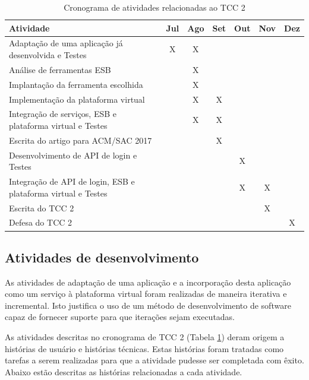\begin{table}[!htb]
\centering
\caption{Cronograma de atividades relacionadas ao TCC 2}
\label{cronograma_tcc2}
\begin{tabular}{|p{9cm}|c|c|c|c|c|c|}
\hline
Atividade                                            & \multicolumn{1}{l|}{Jul} & \multicolumn{1}{l|}{Ago} & \multicolumn{1}{l|}{Set} & \multicolumn{1}{l|}{Out} & \multicolumn{1}{l|}{Nov} & \multicolumn{1}{l|}{Dez}\\ \hline
Adaptação de uma aplicação já desenvolvida e Testes               & X & X &   &   &   &  \\ \hline
Análise de ferramentas ESB                                        &   & X &   &   &   &  \\ \hline
Implantação da ferramenta escolhida                               &   & X &   &   &   &  \\ \hline
Implementação da plataforma virtual                               &   & X & X &   &   &  \\ \hline
Integração de serviços, ESB e plataforma virtual e Testes         &   & X & X &   &   &  \\ \hline
Escrita do artigo para ACM/SAC 2017                               &   &   & X &   &   &  \\ \hline
Desenvolvimento de API de login e Testes                          &   &   &   & X &   &  \\ \hline
Integração de API de login, ESB e plataforma virtual e Testes     &   &   &   & X & X &  \\ \hline
Escrita do TCC 2                                                  &   &   &   &   & X &  \\ \hline
Defesa do TCC 2                                                   &   &   &   &   &   & X\\ \hline
\end{tabular}
\end{table}

\subsection{Atividades de desenvolvimento}
As atividades de adaptação de uma aplicação e a incorporação desta aplicação como um serviço à plataforma virtual foram realizadas de maneira iterativa e incremental. Isto justifica o uso de um método de desenvolvimento de software capaz de fornecer suporte para que iterações sejam executadas.

As atividades descritas no cronograma de TCC 2 (Tabela \ref{cronograma_tcc2}) deram origem a histórias de usuário e histórias técnicas. Estas histórias foram tratadas como tarefas a serem realizadas para que a atividade pudesse ser completada com êxito. Abaixo estão descritas as histórias relacionadas a cada atividade.

